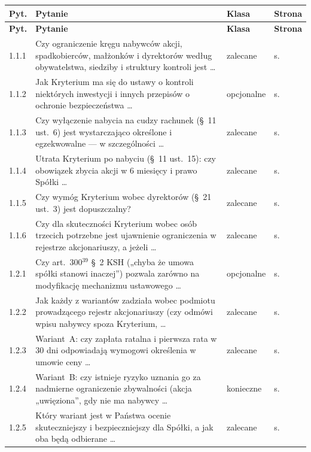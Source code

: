 \documentclass[12pt,a4paper]{report}
\begin{document}
{\small
\begin{longtable}{@{}p{1.2cm} p{9.6cm} p{2.3cm} p{1.4cm}@{}}
\toprule
\textbf{Pyt.} & \textbf{Pytanie} & \textbf{Klasa} & \textbf{Strona} \\
\midrule
\endfirsthead
\toprule
\textbf{Pyt.} & \textbf{Pytanie} & \textbf{Klasa} & \textbf{Strona} \\
\midrule
\endhead
1.1.1 & Czy ograniczenie kręgu nabywców akcji, spadkobierców, małżonków i dyrektorów według obywatelstwa, siedziby i struktury kontroli jest \ldots & zalecane & s.~\pageref{memo:1.1.1} \\
1.1.2 & Jak Kryterium ma się do ustawy o kontroli niektórych inwestycji i innych przepisów o ochronie bezpieczeństwa \ldots & opcjonalne & s.~\pageref{memo:1.1.2} \\
1.1.3 & Czy wyłączenie nabycia na cudzy rachunek (§~11 ust.~6) jest wystarczająco określone i egzekwowalne --- w szczególności \ldots & zalecane & s.~\pageref{memo:1.1.3} \\
1.1.4 & Utrata Kryterium po nabyciu (§~11 ust.~15): czy obowiązek zbycia akcji w 6 miesięcy i prawo Spółki \ldots & zalecane & s.~\pageref{memo:1.1.4} \\
1.1.5 & Czy wymóg Kryterium wobec dyrektorów (§~21 ust.~3) jest dopuszczalny? & zalecane & s.~\pageref{memo:1.1.5} \\
1.1.6 & Czy dla skuteczności Kryterium wobec osób trzecich potrzebne jest ujawnienie ograniczenia w rejestrze akcjonariuszy, a jeżeli \ldots & zalecane & s.~\pageref{memo:1.1.6} \\
1.2.1 & Czy art.~300$^{39}$ §~2 KSH („chyba że umowa spółki stanowi inaczej”) pozwala zarówno na modyfikację mechanizmu ustawowego \ldots & opcjonalne & s.~\pageref{memo:1.2.1} \\
1.2.2 & Jak każdy z wariantów zadziała wobec podmiotu prowadzącego rejestr akcjonariuszy (czy odmówi wpisu nabywcy spoza Kryterium, \ldots & zalecane & s.~\pageref{memo:1.2.2} \\
1.2.3 & Wariant~A: czy zapłata ratalna i pierwsza rata w 30 dni odpowiadają wymogowi określenia w umowie ceny \ldots & zalecane & s.~\pageref{memo:1.2.3} \\
1.2.4 & Wariant~B: czy istnieje ryzyko uznania go za nadmierne ograniczenie zbywalności (akcja „uwięziona”, gdy nie ma nabywcy \ldots & konieczne & s.~\pageref{memo:1.2.4} \\
1.2.5 & Który wariant jest w Państwa ocenie skuteczniejszy i bezpieczniejszy dla Spółki, a jak oba będą odbierane \ldots & zalecane & s.~\pageref{memo:1.2.5} \\

\end{longtable}}
\end{document}
